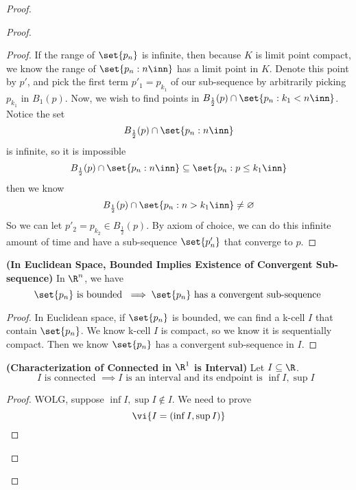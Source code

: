 \documentclass{report}
\begin{document}
\begin{proof}
\begin{proof}
\begin{proof}
If the range of $\set{p_n}$ is infinite, then because $K$ is limit point compact, we know  the range of  $\set{p_n:n\inn}$ has a limit point in $K$. Denote this point  by $p'$, and pick the first term $p'_1=p_{k_1}$ of our sub-sequence by arbitrarily picking  $p_{k_1}$ in  $B_1(p)$. Now, we wish to find points in $B_{\frac{1}{2}}(p)\cap \set{p_n:k_1<n\inn}$. Notice the set
\begin{equation*}
B_{\frac{1}{2}}(p)\cap \set{p_n:n\inn}
\end{equation*}
is infinite, so  it is impossible
\begin{equation*}
B_{\frac{1}{2}}(p)\cap \set{p_n:n\inn}\subseteq \set{p_n:p\leq k_1\inn}
\end{equation*}
then we know 
\begin{equation*}
\text{ $B_{\frac{1}{2}}(p)\cap \set{p_n:n>k_1\inn}\neq \varnothing$  }
\end{equation*}
So we can let $p'_2=p_{k_2}\in B_{\frac{1}{2}}(p)$. By axiom of choice, we can do this infinite amount of time and have a sub-sequence $\set{p'_n}$ that converge to $p$.
\end{proof}
\begin{theorem}
\label{3.9.8}
\textbf{(In Euclidean Space, Bounded Implies Existence of Convergent Sub-sequence)} In $\R^n$, we have
 \begin{equation*}
\set{p_n}\text{ is bounded }\implies \set{p_n}\text{ has a convergent sub-sequence }
\end{equation*}
\end{theorem}
\begin{proof}
In Euclidean space, if $\set{p_n}$ is bounded, we can find a k-cell $I$ that contain  $\set{p_n}$. We know k-cell $I$ is compact, so we know it is sequentially compact. Then we know  $\set{p_n}$ has a convergent sub-sequence in $I$. 
\end{proof}
\begin{theorem}
\label{3.9.9}
\textbf{(Characterization of Connected in $\R^1$ is Interval)} Let $I\subseteq \R$. 
\begin{equation*}
I\text{ is connected }\implies I\text{ is an interval and its endpoint is  $\inf I,\sup I$ }
\end{equation*}
\end{theorem}
\begin{proof}
WOLG, suppose $\inf I,\sup I \not\in I$. We need to prove
\begin{equation*}
  \vi{I=(\inf I,\sup  I)}
\end{equation*}

\end{proof}
\end{proof}
\end{proof}
\end{document}
